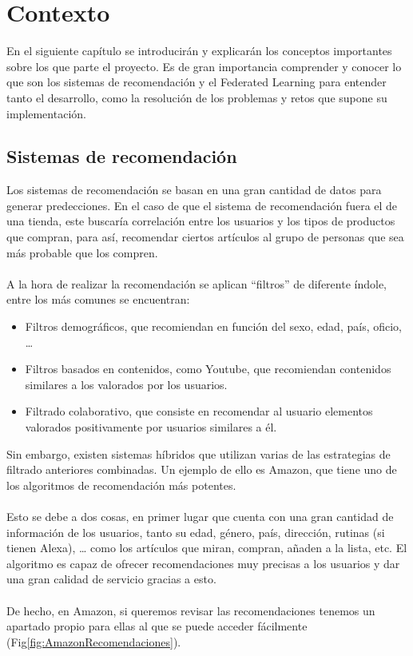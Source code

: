 \chapter{Contexto}
\thispagestyle{fancy}
En el siguiente capítulo se introducirán y explicarán los conceptos importantes sobre los que parte el proyecto. Es de gran importancia comprender y conocer lo que son los sistemas de recomendación y el Federated Learning para entender tanto el desarrollo, como la resolución de los problemas y retos que supone su implementación. 

\section{Sistemas de recomendación}
Los sistemas de recomendación se basan en una gran cantidad de datos para generar predecciones. En el caso de que el sistema de recomendación fuera el de una tienda, este buscaría correlación entre los usuarios y los tipos de productos que compran, para así, recomendar ciertos artículos al grupo de personas que sea más probable que los compren.
\\ \\
A la hora de realizar la recomendación se aplican “filtros” de diferente índole, entre los más comunes se encuentran:
\begin{itemize}
    \item Filtros demográficos, que recomiendan en función del sexo, edad, país, oficio, … 
    \item Filtros basados en contenidos, como Youtube, que recomiendan contenidos similares a los valorados por los usuarios. 
    \item Filtrado colaborativo, que consiste en recomendar al usuario elementos valorados positivamente por usuarios similares a él. 
\end{itemize}

Sin embargo, existen sistemas híbridos que utilizan varias de las estrategias de filtrado anteriores combinadas. Un ejemplo de ello es Amazon, que tiene uno de los algoritmos de recomendación más potentes. 
\\ \\
Esto se debe a dos cosas, en primer lugar que cuenta con una gran cantidad de información de los usuarios, tanto su edad, género, país, dirección, rutinas (si tienen Alexa), … como los artículos que miran, compran, añaden a la lista, etc. El algoritmo es capaz de ofrecer recomendaciones muy precisas a los usuarios y dar una gran calidad de servicio gracias a esto.
\\ \\
De hecho, en Amazon, si queremos revisar las recomendaciones tenemos un apartado propio para ellas al que se puede acceder fácilmente (Fig\ref{fig:AmazonRecomendaciones}).
 
